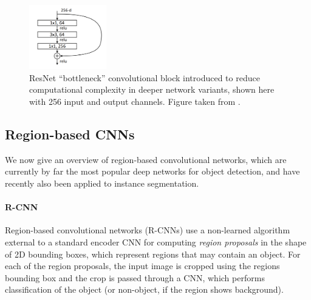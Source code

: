 \begin{figure}[t]
  \centering
  \includegraphics[width=0.3\textwidth]{figures/bottleneck}
\caption{
ResNet \cite{ResNet} \enquote{bottleneck} convolutional block introduced to reduce computational
complexity in deeper network variants, shown here with 256 input and output channels.
Figure taken from \cite{ResNet}.
}
\label{figure:bottleneck}
\end{figure}

\subsection{Region-based CNNs}
\label{ssec:rcnn}
We now give an overview of region-based convolutional networks, which are currently by far the
most popular deep networks for object detection, and have recently also been applied to instance segmentation.

\paragraph{R-CNN}
Region-based convolutional networks (R-CNNs) \cite{RCNN} use a non-learned algorithm external to a standard encoder CNN
for computing \emph{region proposals} in the shape of 2D bounding boxes, which represent regions that may contain an object.
For each of the region proposals, the input image is cropped using the regions bounding box and the crop is
passed through a CNN, which performs classification of the object (or non-object, if the region shows background).

